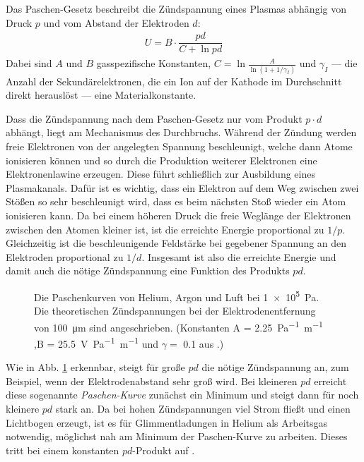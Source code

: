 Das Paschen-Gesetz beschreibt die Zündspannung eines Plasmas abhängig von Druck $ p $ und vom Abstand der Elektroden $ d $:
\begin{align*}
	U = B \cdot \dfrac{pd}{C + \ln pd}
\end{align*}
Dabei sind $ A $  und $ B $ gasspezifische Konstanten, $ C = \ln\frac{A}{\ln(1+1/\gamma_I)} $ und $ \gamma_I $ — die Anzahl der Sekundärelektronen, die ein Ion auf der Kathode im Durchschnitt direkt herauslöst — eine Materialkonstante.  

Dass die Zündspannung nach dem Paschen-Gesetz nur vom Produkt $ p\cdot d $ abhängt, liegt am Mechanismus des Durchbruchs.
Während der Zündung werden freie Elektronen von der angelegten Spannung beschleunigt, welche dann Atome ionisieren können und so durch die Produktion weiterer Elektronen eine Elektronenlawine erzeugen. Diese führt schließlich zur Ausbildung eines Plasmakanals. Dafür ist es wichtig, dass ein Elektron auf dem Weg zwischen zwei Stößen so sehr beschleunigt wird, dass es beim nächsten Stoß wieder ein Atom ionisieren kann. Da bei einem höheren Druck die freie Weglänge der Elektronen zwischen den Atomen kleiner ist, ist die erreichte Energie proportional zu $ 1/p $. Gleichzeitig ist die beschleunigende Feldstärke bei gegebener Spannung an den Elektroden proportional zu $ 1/d $. Insgesamt ist also die erreichte Energie und damit auch die nötige Zündspannung eine Funktion des Produkts $ pd $.

\begin{figure}[H]
	\centering
	
	\caption{Die Paschenkurven von Helium, Argon und Luft bei \qty{1e5}{\pascal}. Die theoretischen Zündspannungen bei der Elektrodenentfernung von \qty{100}{\um} sind angeschrieben. (Konstanten A = \qty{2,25}{Pa^{-1}.m^{-1}}  ,B = \qty{25,5}{V.Pa^{-1}.m^{-1}} und $ \gamma =$ \num{0,1} aus \cite{lehrElectricalBreakdownGases2017,bohmRetardingfieldAnalyzerMeasurements1993}.)}
	\label{fig:paschen_kurve}
\end{figure}

Wie in Abb. \ref{fig:paschen_kurve} erkennbar, steigt für große $ pd $ die nötige Zündspannung an, zum Beispiel, wenn der Elektrodenabstand sehr groß wird. Bei kleineren $ pd $ erreicht diese sogenannte \textit{Paschen-Kurve} zunächst ein Minimum und steigt dann für noch kleinere $ pd $ stark an. Da bei hohen Zündspannungen viel Strom fließt und einen Lichtbogen erzeugt, ist es für Glimmentladungen in Helium als Arbeitsgas notwendig, möglichst nah am Minimum der Paschen-Kurve zu arbeiten. Dieses tritt bei einem konstanten $ pd $-Produkt auf  \cite{paschenUeberFunkenuebergangLuft1889,rajzerGasDischargePhysics1997}.

